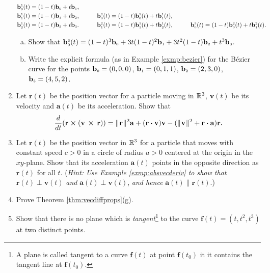 \begin{enumerate}[\bfseries 1.]
  \begin{alignat*}{3}
   \mathbf{b}_{\scriptscriptstyle 0}^{\scriptscriptstyle 1}(t) &= ( 1 - t )\mathbf{b}_{\scriptscriptstyle 0} + t \mathbf{b}_{\scriptscriptstyle 1},
    \\
   \mathbf{b}_{\scriptscriptstyle 1}^{\scriptscriptstyle 1}(t) &= ( 1 - t )\mathbf{b}_{\scriptscriptstyle 1} + t \mathbf{b}_{\scriptscriptstyle 2}, \qquad
    & \mathbf{b}_{\scriptscriptstyle 0}^{\scriptscriptstyle 2}(t) &=
    ( 1 - t )\mathbf{b}_{\scriptscriptstyle 0}^{\scriptscriptstyle 1}(t) + t \mathbf{b}_{\scriptscriptstyle 1}^{\scriptscriptstyle 1}(t),
    \\
   \mathbf{b}_{\scriptscriptstyle 2}^{\scriptscriptstyle 1}(t) &= ( 1 - t )\mathbf{b}_{\scriptscriptstyle 2} + t \mathbf{b}_{\scriptscriptstyle 3}.\qquad
    & \mathbf{b}_{\scriptscriptstyle 1}^{\scriptscriptstyle 2}(t) &=
    ( 1 - t )\mathbf{b}_{\scriptscriptstyle 1}^{\scriptscriptstyle 1}(t) + t \mathbf{b}_{\scriptscriptstyle 2}^{\scriptscriptstyle 1}(t),\qquad
    & \mathbf{b}_{\scriptscriptstyle 0}^{\scriptscriptstyle 3}(t) &=
    ( 1 - t )\mathbf{b}_{\scriptscriptstyle 0}^{\scriptscriptstyle 2}(t) + t \mathbf{b}_{\scriptscriptstyle 1}^{\scriptscriptstyle 2}(t).
  \end{alignat*}
  \begin{enumerate}[(a)]
   \item Show that $\mathbf{b}_{\scriptscriptstyle 0}^{\scriptscriptstyle 3}(t) = (1 - t)^3 \mathbf{b}_{\scriptscriptstyle 0} +
    3t(1 - t)^2 \mathbf{b}_{\scriptscriptstyle 1} + 3t^2 (1 - t) \mathbf{b}_{\scriptscriptstyle 2} + t^3 \mathbf{b}_{\scriptscriptstyle 3}$.
   \item Write the explicit formula (as in Example \ref{exmp:bezier}) for the B\'{e}zier curve for the points
   $\mathbf{b}_{\scriptscriptstyle 0} = (0,0,0)$, $\mathbf{b}_{\scriptscriptstyle 1} = (0,1,1)$, $\mathbf{b}_{\scriptscriptstyle 2} = (2,3,0)$,
   $\mathbf{b}_{\scriptscriptstyle 3} = (4,5,2)$.
  \end{enumerate}
\item 
Let $\mathbf{r}(t)$ be the position vector for a particle moving in $\mathbb{R}^{3}$,
$\mathbf{v}(t)$ be its velocity 
and $\mathbf{a}(t)$ be its acceleration.
Show that
  \begin{displaymath}
   \dfrac{d}{dt} ( \mathbf{r} \bm{\times} ( \mathbf{v}\, \bm{\times} \,\mathbf{r} ) ) =
    \lVert\mspace{1mu}\mathbf{r}\mspace{1mu}\rVert^2 \mathbf{a} + (\mathbf{r} \bm{\cdot} \mathbf{v}) \mathbf{v} -
    (\lVert\mspace{1mu}\mathbf{v}\mspace{1mu}\rVert^2 + \mathbf{r} \bm{\cdot} \mathbf{a})\mathbf{r}.
  \end{displaymath} 
\item 
Let $\mathbf{r}(t)$ be the position vector in $\mathbb{R}^{3}$ for a particle that moves with constant speed $c > 0$ in a circle of radius $a > 0$ centered at the origin in the $xy$-plane. 
Show that its acceleration $\mathbf{a}(t)$ points in the opposite direction as
  $\mathbf{r}(t)$ for all $t$. (\emph{Hint: Use Example \ref{exmp:absvecderiv} to show that} $\mathbf{r}(t)
  \perp \mathbf{v}(t)$ \emph{and} $\mathbf{a}(t) \perp \mathbf{v}(t)$, \emph{and hence} $\mathbf{a}(t) \parallel
  \mathbf{r}(t)$.)
 \item Prove Theorem \ref{thm:vecdiffprops}(g).
 
 \item Show that there is no plane which is \emph{tangent}\footnote{A plane is called tangent to a curve $\mathbf{f}(t)$ at point $\mathbf{f}(t_0)$ it it contains the tangent line at $\mathbf{f}(t_0)$.} to the curve $\mathbf{f}(t)=(t,t^2,t^3)$ at two distinct points.
\end{enumerate}
